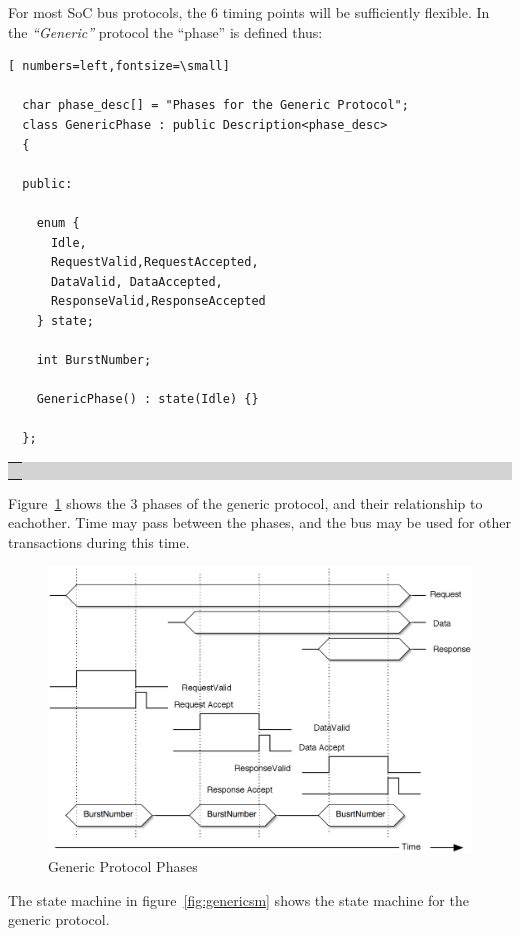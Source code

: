 \documentclass[12pt,oneside]{gsbook}
\def\example#1{\begin{center}\colorbox{lightgrey}{\begin{tabular}{|p{0.6\paperwidth}|}\hline\\#1\\ \\ \hline\end{tabular}}\end{center}}
\newenvironment{exampleenv}{\begin{lrbox}{\examplebox}\begin{minipage}{0.6\paperwidth}}{\end{minipage}\end{lrbox}\example{\usebox{\examplebox}}}
\begin{document}
For most SoC bus protocols, the 6 timing points will be sufficiently
flexible. In the {\em ``Generic''} protocol the ``phase'' is  defined thus:




\begin{exampleenv}
\begin{Verbatim}[ numbers=left,fontsize=\small]

  char phase_desc[] = "Phases for the Generic Protocol";
  class GenericPhase : public Description<phase_desc>
  {

  public:

    enum {
      Idle,
      RequestValid,RequestAccepted,
      DataValid, DataAccepted,
      ResponseValid,ResponseAccepted
    } state;

    int BurstNumber;

    GenericPhase() : state(Idle) {}

  };
\end{Verbatim}
\end{exampleenv}

Figure~\ref{fig:genericwave} shows the 3 phases of the generic
protocol, and their relationship to eachother.
Time may pass between the phases, and the bus may be used for other
transactions during this time. 

\begin{figure}[htbp]
        \centering
        \includegraphics[scale=0.7]{GenericWaveform.eps}
        \caption{Generic Protocol Phases}
        \label{fig:genericwave}
\end{figure}

The state machine in figure~\ref{fig:genericsm} shows the state
machine for the generic protocol.
\end{document}
